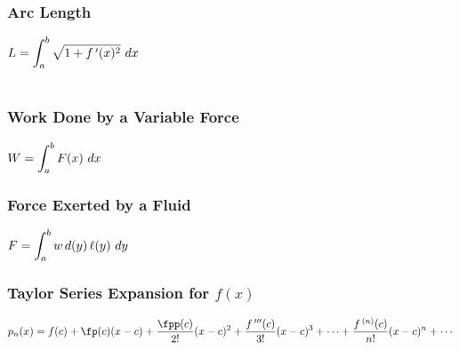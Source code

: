 \subsubsection*{Arc Length}

\noindent
$\ds L = \int_a^b{\sqrt{1+ f\,'(x)^2}}\ dx$\bigskip\\~


\noindent
\begin{minipage}[t]{.5\linewidth}
  \subsubsection*{Work Done by a Variable Force}
  $\displaystyle W = \int_a^b{F(x)}\ dx$
\end{minipage}%
\begin{minipage}[t]{.5\linewidth}
 \subsubsection*{Force Exerted by a Fluid}
 $\ds F = \int_a^b{w\,d(y)\,\ell(y)}\ dy$
\end{minipage}

\subsubsection*{Taylor Series Expansion for $f(x)$}
\noindent$\ds p_n(x) = f(c) + \fp(c)(x-c) + \frac{\fpp(c)}{2!}(x-c)^2 + \frac{f\,'''(c)}{3!}(x-c)^3 + \dotsb + \frac{f\,^{(n)}(c)}{n!}(x-c)^n + \dotsb $
\bigskip


